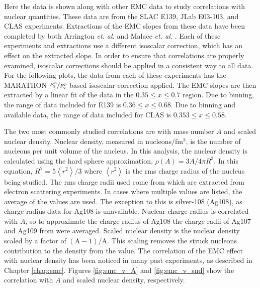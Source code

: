 Here the data is shown along with other EMC data to study correlations with nuclear quantities. These data are from the SLAC E139, JLab E03-103, and CLAS experiments. Extractions of the EMC slopes from these data have been completed by both Arrington \textit{et. al.} \cite{arrington_src} and Malace \textit{et. al.} \cite{malace_emc}. Each of these experiments and extractions use a different isoscalar correction, which has an effect on the extracted slope. In order to ensure that correlations are properly examined, isoscalar corrections should be applied in a consistent way to all data. For the following plots, the data from each of these experiments has the MARATHON $\nicefrac{F_2^n}{F_2^p}$ based isoscalar correction applied. The EMC slopes are then extracted by a linear fit of the data in the $0.35 \leq x \leq 0.7$ region. Due to binning, the range of data included for E139 is $0.36 \leq x \leq 0.68$. Due to binning and available data, the range of data included for CLAS is $0.353 \leq x \leq 0.58$.

The two most commonly studied correlations are with mass number $A$ and scaled nuclear density. Nuclear density, measured in nucleons/fm$^{3}$, is the number of nucleons per unit volume of the nucleus. In this analysis, the nuclear density is calculated using the hard sphere approximation, $\rho\left(A\right) = 3A/4\pi R^3$. In this equation, $R^2=5\left<r^2\right>/3$ where $\left<r^2\right>$ is the rms charge radius of the nucleus being studied. The rms charge radii used come from \cite{DeVries} which are extracted from electron scattering experiments. In cases where multiple values are listed, the average of the values are used. The exception to this is silver-108 (Ag108), as charge radius data for Ag108 is unavailable. Nuclear charge radius is correlated with $A$, so to approximate the charge radius of Ag108 the charge radii of Ag107 and Ag109 from \cite{2012_charge_radii} were averaged. Scaled nuclear density is the nuclear density scaled by a factor of $\left(\text{A}-1\right)$/A. This scaling removes the struck nucleons contribution to the density from the value. The correlation of the EMC effect with nuclear density has been noticed in many past experiments, as described in Chapter \ref{chap:emc}. Figures \ref{fig:emc_v_A} and \ref{fig:emc_v_snd} show the correlation with $A$ and scaled nuclear density, respectively.

